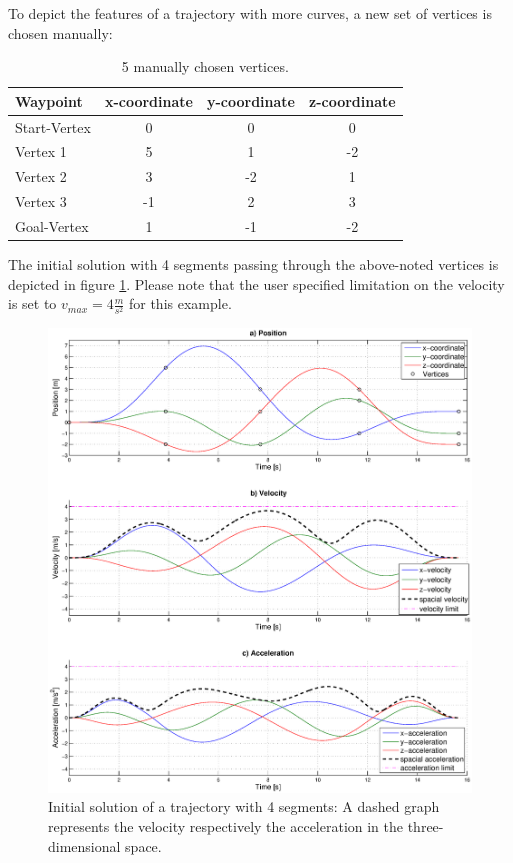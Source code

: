 To depict the features of a trajectory with more curves, a new set of vertices is chosen manually:

\begin{table}[H] 
\begin{center}
    \begin{tabular}{ | l | c | c | c |}
    \hline
    Waypoint & x-coordinate & y-coordinate & z-coordinate\\ \hline
    Start-Vertex & 0 & 0 & 0 \\ \hline
    Vertex 1 & 5 & 1 & -2\\ \hline
   Vertex 2 & 3 & -2 & 1\\ \hline
   Vertex 3 & -1 & 2 & 3\\ \hline
    Goal-Vertex & 1 & -1 & -2\\
    \hline
    \end{tabular}
\caption{5 manually chosen  vertices.}
    \label{tab:5vertices}
\end{center}
\end{table}


The initial solution with 4 segments passing through the above-noted vertices is depicted in figure \ref{pic:optimizedSolution4init}. Please note that the user specified limitation on the velocity is set to $v_{max} = 4 \frac{m}{s^2}$ for this example.


\begin{figure}[H]
   \centering
   \includegraphics[trim = 33mm 30mm 30mm 15mm,clip,width=1\textwidth]{pics/4SegInit15s67.eps}
   \caption{Initial solution of a trajectory with 4 segments: A dashed graph represents the velocity respectively the acceleration in the three-dimensional space.}
   \label{pic:optimizedSolution4init}
\end{figure}
\newpage

